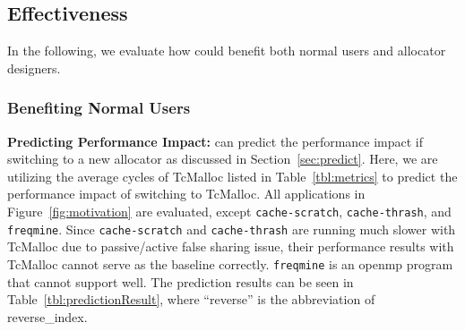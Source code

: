 \subsection{Effectiveness}
\label{sec:effectiveness}

In the following, we evaluate how \MP{} could benefit both normal users and allocator designers. 
\subsubsection{Benefiting Normal Users\\} 

\noindent \textbf{Predicting Performance Impact:} 
\MP{} can predict the performance impact if switching to a new allocator as discussed in Section~\ref{sec:predict}. Here, we are utilizing the average cycles of TcMalloc listed in Table~\ref{tbl:metrics} to predict the performance impact of switching to TcMalloc. All applications in Figure~\ref{fig:motivation} are evaluated, except \texttt{cache-scratch},  \texttt{cache-thrash}, and \texttt{freqmine}.  Since \texttt{cache-scratch} and \texttt{cache-thrash} are running much slower with TcMalloc due to passive/active false sharing issue, their performance results with TcMalloc cannot serve as the baseline correctly. \texttt{freqmine} is an openmp program that \MP{} cannot support well. The prediction results can be seen in Table~\ref{tbl:predictionResult}, where ``reverse'' is the abbreviation of reverse\_index. 

